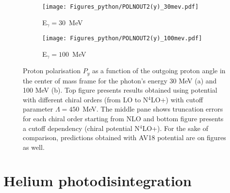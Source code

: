     
    \begin{figure}[h]
        \centering
        \begin{subfigure}[b]{0.48\textwidth}
            \texttt{[image: Figures\_python/POLNOUT2(y)\_30mev.pdf]}
            \caption{\small E$_\gamma = 30$~MeV}
        \end{subfigure}
        \begin{subfigure}[b]{0.48\textwidth}
            \texttt{[image: Figures\_python/POLNOUT2(y)\_100mev.pdf]}
            \caption{\small E$_\gamma = 100$~MeV}
        \end{subfigure}
        \caption{Proton polarisation $P_y$ 
        as a function of the outgoing proton angle in the center of mass frame 
        for the photon's energy 30 MeV (a) and 100 MeV (b).
        Top figure presents results obtained using potential
        with different chiral orders (from LO to N$^4$LO+) with cutoff parameter $\Lambda=450$~MeV.
        The middle pane shows truncation errors for each 
        chiral order starting from NLO and
        bottom figure presents a cutoff dependency (chiral potential N$^4$LO+).
        For the sake of comparison, predictions obtained with AV18 potential are on  figures as well.}
\end{figure}
    
\section{Helium photodisintegration}

